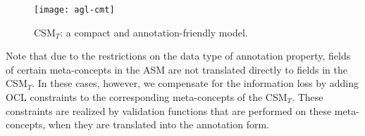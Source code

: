 \begin{figure*}[ht]
	\begin{center}
		\texttt{[image: agl-cmt]}
	\end{center}
	\caption{CSM$_T$: a compact and annotation-friendly model.} %
	\label{fig:agl-csmt}
\end{figure*}

Note that due to the restrictions on the data type of annotation property, fields of certain meta-concepts in the ASM are not translated directly to fields in the CSM$_T$. In these cases, however, we compensate for the information loss by adding OCL constraints to the corresponding meta-concepts of the CSM$_T$. These constraints are realized by validation functions that are performed on these meta-concepts, when they are translated into the annotation form.
%
